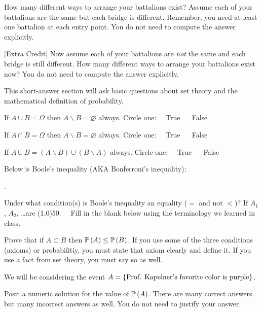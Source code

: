 \documentclass[12pt]{article}
\begin{document}
\benum
{} How many different ways to arrange your battalions exist? Assume each of your battalions are the same but each bridge is different. Remember, you need at least one battalion at each entry point. You do not need to compute the answer explicitly.

 [Extra Credit] Now assume each of your battalions are \textit{not }the same and each bridge is still different. How many different ways to arrange your battalions exist now? You do not need to compute the answer explicitly.

\eenum


\problem This short-answer section will ask basic questions about set theory and the mathematical definition of probability.

\benum

 If $A \cup B = \Omega$ then $A \backslash B = \varnothing$ always. Circle one:~~ True ~~ False


 If $A \cap B = \Omega$ then $A \backslash B = \varnothing$ always. Circle one:~~ True ~~ False

 If $A \cup B = (A \backslash B) \cup (B \backslash A)$ always. Circle one:~~ True ~~ False

 Below is Boole's inequality (AKA Bonferroni's inequality):

\beqn
{} \leq {}.
\eeqn

Under what condition(s) is Boole's inequality an equality (\ie $=$ and not $<$)? If $A_1$, $A_2$, \ldots are \line(1,0){50}.~~ Fill in the blank below using the terminology we learned in class. 

 Prove that if $A \subset B$ then $\mathbb{P}\left(A\right) \leq \mathbb{P}\left(B\right)$. If you use some of the three conditions (axioms) or probabilitiy, you must state that axiom clearly and define it. If you use a fact from set theory, you must say so as well. 

\eenum

\problem We will be considering the event $A = \left\{\text{Prof. Kapelner's favorite color is purple}\right\}$.

\benum 

 Posit a numeric solution for the value of $\mathbb{P}\left(A\right)$. There are many correct answers but many incorrect answers as well. You do not need to justify your answer. 
\end{document}
